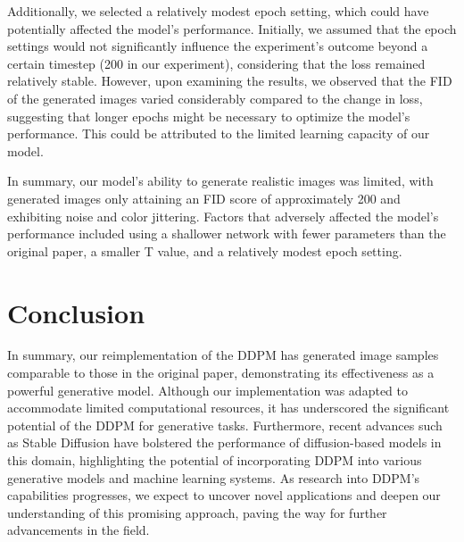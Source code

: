 \documentclass[letterpaper]{article} %
\begin{document}
Additionally, we selected a relatively modest epoch setting, which could have potentially affected the model's performance. Initially, we assumed that the epoch settings would not significantly influence the experiment's outcome beyond a certain timestep (200 in our experiment), considering that the loss remained relatively stable. However, upon examining the results, we observed that the FID of the generated images varied considerably compared to the change in loss, suggesting that longer epochs might be necessary to optimize the model's performance. This could be attributed to the limited learning capacity of our model.

In summary, our model's ability to generate realistic images was limited, with generated images only attaining an FID score of approximately 200 and exhibiting noise and color jittering. Factors that adversely affected the model's performance included using a shallower network with fewer parameters than the original paper, a smaller T value, and a relatively modest epoch setting.

\section{Conclusion}
In summary, our reimplementation of the DDPM has generated image samples comparable to those in the original paper, demonstrating its effectiveness as a powerful generative model. Although our implementation was adapted to accommodate limited computational resources, it has underscored the significant potential of the DDPM for generative tasks. Furthermore, recent advances such as Stable Diffusion have bolstered the performance of diffusion-based models in this domain, highlighting the potential of incorporating DDPM into various generative models and machine learning systems. As research into DDPM's capabilities progresses, we expect to uncover novel applications and deepen our understanding of this promising approach, paving the way for further advancements in the field.


\end{document}
